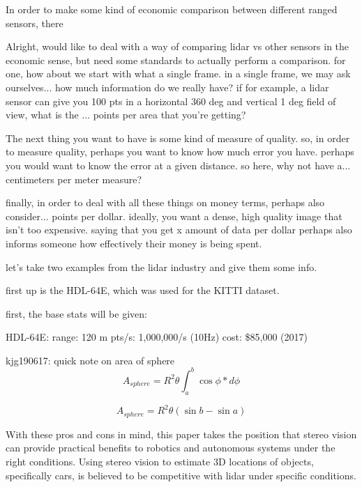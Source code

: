 In order to make some kind of economic comparison between different ranged sensors, there 

Alright, would like to deal with a way of comparing lidar vs other sensors in the economic sense, but need some standards to actually perform a comparison. for one, how about we start with what a single frame. in a single frame, we may ask ourselves... how much information do we really have? if for example, a lidar sensor can give you 100 pts in a horizontal 360 deg and vertical 1 deg field of view, what is the ... points per area that you're getting? 


The next thing you want to have is some kind of measure of quality. so, in order to measure quality, perhaps you want to know how much error you have. perhaps you would want to know the error at a given distance. so here, why not have a... centimeters per meter measure? 

finally, in order to deal with all these things on money terms, perhaps also consider... points per dollar. ideally, you want a dense, high quality image that isn't too expensive. saying that you get x amount of data per dollar perhaps also informs someone how effectively their money is being spent. 

let's take two examples from the lidar industry and give them some info. 

first up is the HDL-64E, which was used for the KITTI dataset. 

first, the base stats will be given: 


HDL-64E:
range: 120 m
pts/s: 1,000,000/s (10Hz)
cost: \$85,000 (2017)


kjg190617: quick note on area of sphere
$$ A_{sphere}=R^2\theta \int_{a}^{b}\cos\phi*d\phi $$

$$ A_{sphere}=R^2\theta (\sin{b} - \sin{a})$$


With these pros and cons in mind, this paper takes the position that stereo vision can provide practical benefits to robotics and autonomous systems under the right conditions. Using stereo vision to estimate 3D locations of objects, specifically cars, is believed to be competitive with lidar under specific conditions.










